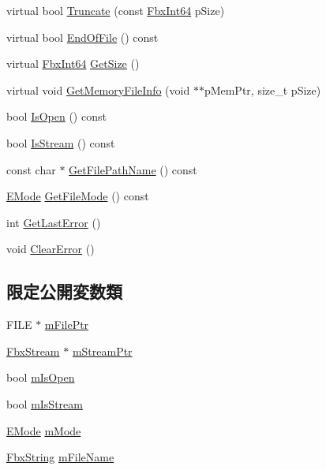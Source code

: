 \begin{DoxyCompactItemize}
\item 
virtual bool \hyperlink{class_fbx_file_aa93638b789020857a19306175a921271}{Truncate} (const \hyperlink{fbxtypes_8h_ac7e1334c7c6aacc9c8a9dccddebb4368}{Fbx\+Int64} p\+Size)
\item 
virtual bool \hyperlink{class_fbx_file_a3e438294b7e07dbc3b672ba771ebdd51}{End\+Of\+File} () const
\item 
virtual \hyperlink{fbxtypes_8h_ac7e1334c7c6aacc9c8a9dccddebb4368}{Fbx\+Int64} \hyperlink{class_fbx_file_aa7d93faa5ec8ef431b6c9b82845e8271}{Get\+Size} ()
\item 
virtual void \hyperlink{class_fbx_file_ab603c8d30f989a0d195cc720181b18b3}{Get\+Memory\+File\+Info} (void $\ast$$\ast$p\+Mem\+Ptr, size\+\_\+t p\+Size)
\item 
bool \hyperlink{class_fbx_file_acf436397d99f8b7fb5baf5b32eac26b1}{Is\+Open} () const
\item 
bool \hyperlink{class_fbx_file_ae515a0ebd07a7ebedd0a62b5299cd417}{Is\+Stream} () const
\item 
const char $\ast$ \hyperlink{class_fbx_file_ace17e0fc453b1fa2f565af58eb16ad26}{Get\+File\+Path\+Name} () const
\item 
\hyperlink{class_fbx_file_a0370e8fd17b3658f718e1350a6a6f462}{E\+Mode} \hyperlink{class_fbx_file_a26175571d3f5682ea7af8ac5ba1f640f}{Get\+File\+Mode} () const
\item 
int \hyperlink{class_fbx_file_a797c6a169a44de27d96d991e884dafed}{Get\+Last\+Error} ()
\item 
void \hyperlink{class_fbx_file_abaf8e0ca1c1f47a349848ec49966cc6a}{Clear\+Error} ()
\end{DoxyCompactItemize}
\subsection*{限定公開変数類}
\begin{DoxyCompactItemize}
\item 
F\+I\+LE $\ast$ \hyperlink{class_fbx_file_a2be552f90b28c49c17626fe52309694a}{m\+File\+Ptr}
\item 
\hyperlink{class_fbx_stream}{Fbx\+Stream} $\ast$ \hyperlink{class_fbx_file_ad2c5d8c4cc9284b848f2283af005325f}{m\+Stream\+Ptr}
\item 
bool \hyperlink{class_fbx_file_a88370b753b3632ed4970357a2ec290d4}{m\+Is\+Open}
\item 
bool \hyperlink{class_fbx_file_ada5a1b024c0b9b67aede8605c4565013}{m\+Is\+Stream}
\item 
\hyperlink{class_fbx_file_a0370e8fd17b3658f718e1350a6a6f462}{E\+Mode} \hyperlink{class_fbx_file_ad9b7111817531ba69e1abddc7cc6d247}{m\+Mode}
\item 
\hyperlink{class_fbx_string}{Fbx\+String} \hyperlink{class_fbx_file_a47455f1ec52460e17c7a687f2e873128}{m\+File\+Name}
\end{DoxyCompactItemize}


